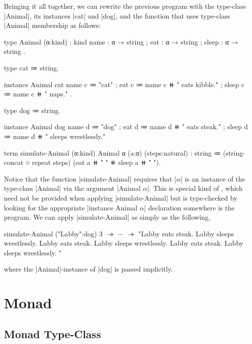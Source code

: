 Bringing it all together, we can rewrite the previous program with the type-class \code|Animal|, its instances \code|cat| and \code|dog|, and the function that uses type-class \code|Animal| membership as follows:
%
\begin{snippet}
type Animal (α:kind) : kind
  { name  : α → string
  ; eat   : α → string
  ; sleep : α → string }.

type cat ≔ string.

instance Animal cat
  { name  c ≔ "cat"
  ; eat   c ≔ name c ⧺ " eats kibble."
  ; sleep c ≔ name c ⧺ " naps." }.

type dog ≔ string.

instance Animal dog
  { name  d ≔ "dog"
  ; eat   d ≔ name d ⧺ " eats steak."
  ; sleep d ≔ name d ⧺ " sleeps wrestlessly." }

term simulate-Animal (α:kind) {Animal α} (a:α) (steps:natural) : string
  ≔ (string-concat ○ repeat steps)
      (eat a ⧺ " " ⧺ sleep a ⧺ " ").
\end{snippet}
%
Notice that the function \code|simulate-Animal| requires that \code|$α$| is an instance of the type-class \code|Animal| via the argument \code|{Animal $α$}|.
This is special kind of , which need not be provided when applying \code|simulate-Animal| but is type-checked by looking for the appropriate \code|instance Animal $α$| declaration somewhere is the program.
We can apply \code|simulate-Animal| as simply as the following,
%
\begin{snippet}
simulate-Animal ("Labby":dog) 3
$↠$ $\cdots$ $↠$
"Labby eats steak. Labby sleeps wrestlessly. Labby eats steak. Labby sleeps wrestlessly. Labby eats steak. Labby sleeps wrestlessly. "
\end{snippet}
where the \code|Animal|-instance of \code|dog| is passed implicitly.

\section{Monad}
\label{sec:constructing-monads}

\subsection{Monad Type-Class}
\label{sec:monad-type-class}

